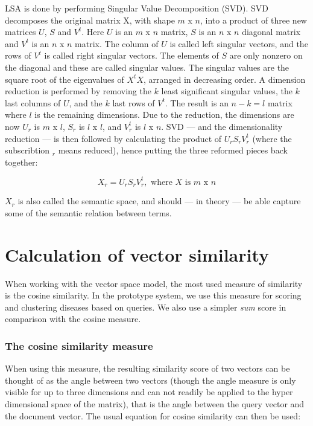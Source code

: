 LSA is done by performing Singular Value Decomposition (SVD). SVD
decomposes the original matrix X, with shape $\mathit{m}$ x
$\mathit{n}$, into a product of three new matrices $U$, $S$ and
$V^{t}$. Here $U$ is an $\mathit{m}$ x $\mathit{n}$ matrix, $S$ is an
$\mathit{n}$ x $\mathit{n}$ diagonal matrix and $V^{t}$ is an
$\mathit{n}$ x $\mathit{n}$ matrix. The column of $U$ is called left
singular vectors, and the rows of $V^{t}$ is called right singular
vectors. The elements of $S$ are only nonzero on the diagonal and
these are called singular values. The singular values are the square
root of the eigenvalues of $X^{t}X$, arranged in decreasing order. A
dimension reduction is performed by removing the $k$ least significant
singular values, the $k$ last columns of $U$, and the $k$ last rows of
$V^{t}$. The result is an $n - k = l$ matrix where $l$ is the
remaining dimensions. Due to the reduction, the dimensions are now
$U_{r}$ is $\mathit{m}$ x $\mathit{l}$, $S_{r}$ is $\mathit{l}$ x
$\mathit{l}$, and $V_{r}^{t}$ is $\mathit{l}$ x $\mathit{n}$. SVD ---
and the dimensionality reduction --- is then followed by calculating
the product of $U_{r}S_{r}V_{r}^{t}$ (where the subscribtion $_{r}$
means reduced), hence putting the three reformed pieces back together:

\[
X_{r} = U_{r}S_{r}V_{r}^{t}, \textrm{ where } X \textrm{ is } m \textrm{ x }n
\]

$X_{r}$ is also called the semantic space, and should --- in theory --- be
able capture some of the semantic relation between terms.

\section{Calculation of vector similarity\label{VectorSimilarity}}

When working with the vector space model, the most used measure of
similarity is the cosine similarity. In the prototype system, we use
this measure for scoring and clustering diseases based on queries. We
also use a simpler \textit{sum} score in comparison with the cosine
measure.

\subsubsection{The cosine similarity measure}
When using this measure, the resulting similarity score of two vectors
can be thought of as the angle between two vectors (though the angle
measure is only visible for up to three dimensions and can not readily
be applied to the hyper dimensional space of the matrix), that is the
angle between the query vector and the document vector. The usual
equation for cosine similarity can then be used:

